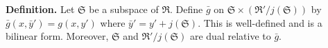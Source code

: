 \textbf{Definition.} Let $\mathfrak{S}$ be a subspace of $\mathfrak{R}$. Define $\bar{g}$ on $\mathfrak{S} \times (\mathfrak{R}' / j(\mathfrak{S}))$ by $\bar{g}(x, \bar{y}') = g(x, y')$ where $\bar{y}' = y' + j(\mathfrak{S})$. This is well-defined and is a bilinear form. Moreover, $\mathfrak{S}$ and $\mathfrak{R}' / j(\mathfrak{S})$ are dual relative to $\bar{g}$.
